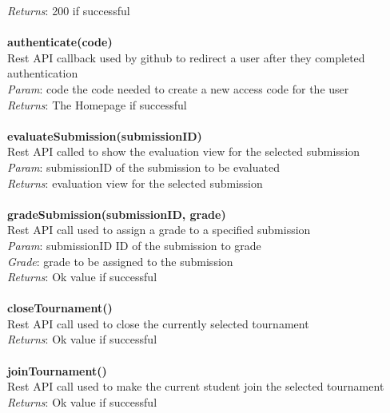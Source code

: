 \documentclass{article}
\begin{document}
\textit{Returns}: 200 if successful\\
\\
\textbf{authenticate(code)}\\
Rest API callback used by github to redirect a user after they completed authentication\\
\textit{Param}: code the code needed to create a new access code for the user\\
\textit{Returns}: The Homepage if successful\\
\\
\textbf{evaluateSubmission(submissionID)}\\
Rest API called to show the evaluation view for the selected submission\\
\textit{Param}: submissionID of the submission to be evaluated\\
\textit{Returns}: evaluation view for the selected submission\\
\\
\textbf{gradeSubmission(submissionID, grade)}\\
Rest API call used to assign a grade to a specified submission\\
\textit{Param}: submissionID ID of the submission to grade\\
\textit{Grade}: grade to be assigned to the submission\\
\textit{Returns}: Ok value if successful\\
\\
\textbf{closeTournament()}\\
Rest API call used to close the currently selected tournament\\
\textit{Returns}: Ok value if successful\\
\\
\textbf{joinTournament()}\\
Rest API call used to make the current student join the selected tournament\\
\textit{Returns}: Ok value if successful\\
\end{document}
